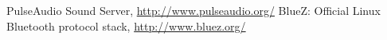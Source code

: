 \documentclass[conference]{./IEEEtran}
\begin{document}

%
%
%
\begin{thebibliography}{1}
		PulseAudio Sound Server, 
		\url{http://www.pulseaudio.org/}
		BlueZ: Official Linux Bluetooth protocol stack, 
		\url{http://www.bluez.org/}



\end{thebibliography}




\end{document}
